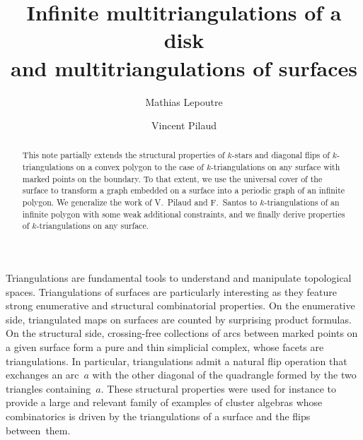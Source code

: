 \documentclass{amsart}
\title[Infinite multitriangulations of a disk and multitriangulations of surfaces]{Infinite multitriangulations of a disk \\ and multitriangulations of surfaces}
\author{Mathias Lepoutre}
\author{Vincent Pilaud}
\theoremstyle{remark}
\begin{document}
\begin{abstract}
This note partially extends the structural properties of $k$-stars and diagonal flips of $k$-triangulations on a convex polygon to the case of $k$-triangulations on any surface with marked points on the boundary. 
To that extent, we use the universal cover of the surface to transform a graph embedded on a surface into a periodic graph of an infinite polygon.
We generalize the work of V.~Pilaud and F.~Santos to $k$-triangulations of an infinite polygon with some weak additional constraints, and we finally derive properties of $k$-triangulations on any surface.
\end{abstract}

\vspace*{-.3cm}

\maketitle


Triangulations are fundamental tools to understand and manipulate topological spaces.
Triangulations of surfaces are particularly interesting as they feature strong enumerative and structural combinatorial properties.
On the enumerative side, triangulated maps on surfaces are counted by surprising product formulas. %
On the structural side, crossing-free collections of arcs between marked points on a given surface form a pure and thin simplicial complex, whose facets are triangulations.
In particular, triangulations admit a natural flip operation that exchanges an arc~$a$ with the other diagonal of the quadrangle formed by the two triangles containing~$a$.
These structural properties were used for instance to provide a large and relevant family of examples of cluster algebras whose combinatorics is driven by the triangulations of a surface and the flips between~them.
\end{document}
